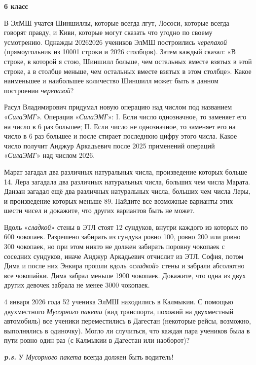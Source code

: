 \hspace{3mm}

\centerline{\bf \Huge 6 класс}


В ЭлМШ учатся Шиншиллы, которые всегда лгут, Лососи, которые всегда говорят правду, и Киви, которые могут сказать что угодно по своему усмотрению. Однажды 20262026 учеников ЭлМШ построились \textit{черепахой} (прямоугольник из 10001 строки и 2026 столбцов). Затем каждый сказал: «В строке, в которой я стою, Шиншилл больше, чем остальных вместе взятых в этой строке, а в столбце меньше, чем остальных вместе взятых в этом столбце». Какое наименьшее и наибольшее количество Шиншилл может быть в данном построении \textit{черепахой}?

Расул Владимирович придумал новую операцию над числом под названием «\textit{СилаЭМГ}». Операция «\textit{СилаЭМГ}»: I. Если число однозначное, то заменяет его на число в 6 раз большее; II. Если число не однозначное, то заменяет его на число в 6 раз большее и после стирает последнюю цифру этого числа. Какое число получит Анджур Аркадьевич после 2025 применений операций «\textit{СилаЭМГ}» над числом 2026.

Марат загадал два различных натуральных числа, произведение которых больше 14. Лера загадала два различных натуральных числа, больших чем числа Марата. Данзан загадал ещё два различных натуральных числа, больших чем числа Леры, и произведение которых меньше 89. Найдите все возможные варианты этих шести чисел и докажите, что других вариантов быть не может.

Вдоль «\textit{сладкой}» стены в ЭТЛ стоят 12 сундуков, внутри каждого из которых по 600 чокопаек. Разрешено забирать из сундука ровно 100, ровно 200 или ровно 300 чокопаек, но при этом никто не должен забирать поровну чокопаек с соседних сундуков, иначе Анджур Аркадьевич отчислит из ЭТЛ. София, потом Дима и после них Энкира прошли вдоль «\textit{сладкой}» стены и забрали абсолютно все чокопайки. Дима забрал меньше 1900 чокопаек. Докажите, что одна из двух других девочек забрала не менее 3000 чокопаек.

4 января 2026 года 52 ученика ЭлМШ находились в Калмыкии. С помощью двухместного \textit{Мусорного пакета} (вид транспорта, похожий на двухместный автомобиль) все ученики переместились в Дагестан (некоторые рейсы, возможно, выполнялись в одиночку). 
Могло ли случиться, что каждая пара учеников была в пути ровно один раз (с Калмыкии в Дагестан или наоборот)?

\textit{\textbf{p.s.}} У \textit{Мусорного пакета} всегда должен быть водитель!
